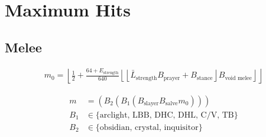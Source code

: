 \chapter{Maximum Hits}




\section{Melee}
	\begin{align}
		m_0 = \left\lfloor \frac{1}{2} + \frac{64 + E_\text{strength}}{640}\left\lfloor\left\lfloor\bar{L}_\text{strength} B_\text{prayer} + B_\text{stance}\right\rfloor B_\text{void melee}\right\rfloor\right\rfloor
	\end{align}

	\begin{align}
		m &= (B_2(B_1(B_\text{slayer}B_\text{salve} m_0))) \\
		B_1 &\in \{\text{arclight, LBB, DHC, DHL, C/V, TB}\} \\
		B_2 &\in \{\text{obsidian, crystal, inquisitor}\} \\
	\end{align}



